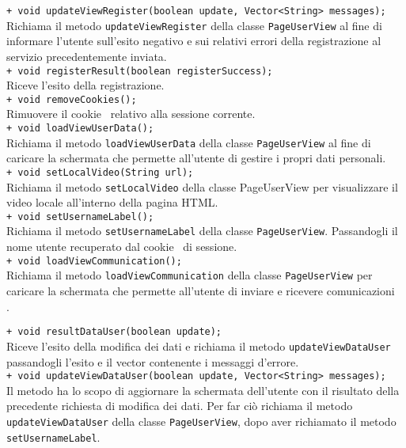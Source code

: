 {{\begin{sloppypar}
{{{\begin{itemize}
{					\texttt{+ void updateViewRegister(boolean update, Vector<String> messages);}\\
					Richiama il metodo \texttt{updateViewRegister} della classe \texttt{PageUserView} al fine di informare l'utente sull'esito negativo e sui relativi errori della registrazione al servizio precedentemente inviata.\\
					
					\texttt{+ void registerResult(boolean registerSuccess);}\\
					Riceve l'esito della registrazione.\\

					\texttt{+ void removeCookies();}\\
					Rimuovere il cookie\g~ relativo alla sessione corrente.\\

					\texttt{+ void loadViewUserData();}\\
					Richiama il metodo \texttt{loadViewUserData} della classe \texttt{PageUserView} al fine di caricare la schermata che permette all'utente di gestire i propri dati personali.\\
					
					\texttt{+ void setLocalVideo(String url);}\\
					Richiama il metodo \texttt{setLocalVideo} della classe PageUserView per visualizzare il video locale all'interno della pagina HTML\g.\\

					\texttt{+ void setUsernameLabel();}\\
					Richiama il metodo \texttt{setUsernameLabel} della classe \texttt{PageUserView}. Passandogli il nome utente recuperato dal cookie\g~ di sessione.\\
					
					\texttt{+ void loadViewCommunication();}\\
					Richiama il metodo \texttt{loadViewCommunication} della classe \texttt{PageUserView} per caricare la schermata che permette all'utente di inviare e ricevere comunicazioni\\.

					\texttt{+ void resultDataUser(boolean update);}\\
					Riceve l'esito della modifica dei dati e richiama il metodo
					\texttt{updateViewDataUser} passandogli l'esito e il vector contenente i messaggi d'errore.\\
					
					\texttt{+ void updateViewDataUser(boolean update, Vector<String> messages);}\\
					Il metodo ha lo scopo di aggiornare la schermata dell'utente con il risultato della precedente richiesta di modifica dei dati. Per far ciò richiama il metodo \texttt{updateViewDataUser} della classe \texttt{PageUserView}, dopo aver richiamato il metodo \texttt{setUsernameLabel}.\\
					
}
\end{itemize}}}}
\end{sloppypar}}}
